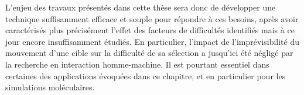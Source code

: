 	
	L'enjeu des travaux présentés dans cette thèse sera donc de développer une technique suffisamment efficace et souple pour répondre à ces besoins, après avoir caractérisés plus précisément l'effet des facteurs de difficultés identifiés mais à ce jour encore insuffisamment étudiés. En particulier, l'impact de l'imprévisibilité du mouvement d'une cible sur la difficulté de sa sélection a jusqu'ici été négligé par la recherche en interaction homme-machine. Il est pourtant essentiel dans certaines des applications évoquées dans ce chapitre, et en particulier pour les simulations moléculaires.

\clearpage
